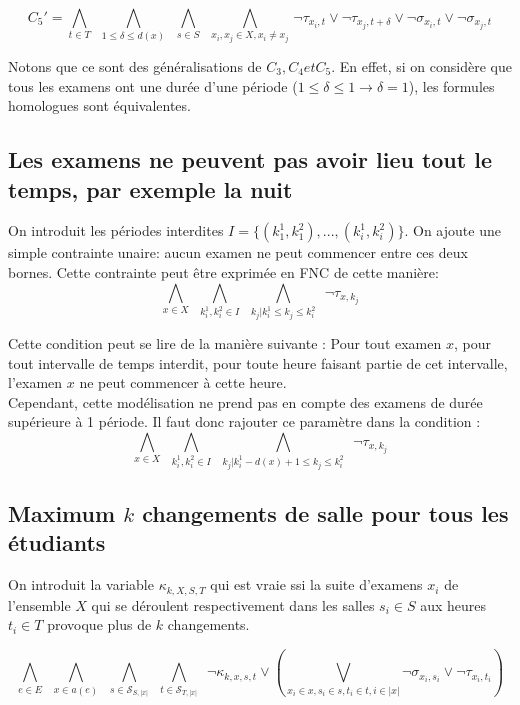 \documentclass[a4paper]{article}
\begin{document}
$$ C_5' = \bigwedge\limits_{t \in T} \,\,\,
          \bigwedge\limits_{1 \leq \delta \leq d(x)} \,\,\,
          \bigwedge\limits_{s \in S} \,\,\,
          \bigwedge\limits_{x_i, x_j \in X, x_i \neq x_j} \,
          \lnot \tau_{x_i,t} \lor \lnot \tau_{x_j,t+\delta} \lor \lnot \sigma_{x_i,t} \lor \lnot \sigma_{x_j,t} $$


Notons que ce sont des généralisations de $C_3, C_4 et C_5$. En effet, si on considère que tous les
examens ont une durée d'une période ($1 \leq \delta \leq 1 \rightarrow \delta = 1$), les formules homologues sont équivalentes.



\subsection{Les examens ne peuvent pas avoir lieu tout le temps, par exemple la nuit}
On introduit les périodes interdites $I = \{(k_1^1, k_1^2), ..., (k_{i}^{1},k_{i}^{2})\}$.
On ajoute une simple contrainte unaire: aucun examen ne peut commencer entre ces deux bornes. Cette contrainte peut être exprimée en FNC de cette manière:
$$ \bigwedge\limits_{x \in X} \,\,\,
  \bigwedge\limits_{k_i^1, k_i^2 \in I}\,\,\,
  \bigwedge\limits_{k_j | k_i^1 \leq k_j \leq k_i^2} \,\,\,
  \lnot \tau_{x,k_j}$$

Cette condition peut se lire de la manière suivante : Pour tout examen $x$, pour tout intervalle de temps interdit, pour toute heure faisant partie de cet intervalle, l'examen $x$ ne peut commencer à cette heure.\\

Cependant, cette modélisation ne prend pas en compte des examens de durée supérieure à 1 période. Il faut donc rajouter ce paramètre dans la condition :
$$ \bigwedge\limits_{x \in X} \,\,\,
  \bigwedge\limits_{k_i^1, k_i^2 \in I}\,\,\,
  \bigwedge\limits_{k_j | k_i^1-d(x)+1 \leq k_j \leq k_i^2} \,\,\,
  \lnot \tau_{x,k_j}$$

\subsection{Maximum $k$ changements de salle pour tous les étudiants}
  On introduit la variable $\kappa_{k, X, S, T}$ qui est vraie ssi la suite d'examens $x_i$ de l'ensemble $X$ qui se déroulent respectivement dans les salles $s_i \in S$ aux heures $t_i \in T$ provoque plus de $k$ changements.

  $$  \bigwedge\limits_{e \in E} \,\,\,
      \bigwedge\limits_{x \in a(e)} \,\,\,
      \bigwedge\limits_{s \in \mathcal{S}_{S, |x|}} \,\,\,
      \bigwedge\limits_{t \in \mathcal{S}_{T, |x|}} \,\,\,
      \lnot \kappa_{k, x, s, t} \lor
      (\bigvee\limits_{x_i \in x, s_i \in s, t_i \in t, i \in |x|} 
       \lnot \sigma_{x_i, s_i} \lor \lnot \tau_{x_i, t_i}) $$
\end{document}
